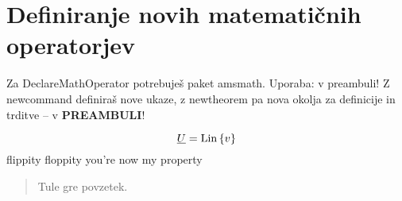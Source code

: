 \documentclass[a4paper]{article}
\DeclareMathOperator{\sgn}{sgn}
\DeclareMathOperator{\lin}{Lin}
\newcommand{\pip}{flippity floppity you're now my property}
\begin{document}

\nocite{*} %





\section{Definiranje novih matematičnih operatorjev}
Za DeclareMathOperator potrebuješ paket amsmath. Uporaba: v preambuli!
Z newcommand definiraš nove ukaze, z newtheorem pa nova okolja za 
definicije in trditve -- v \textbf{PREAMBULI}!

\[\emph{U} = \lin{\left\{ v \right\}}\]
\pip



\pagebreak
\begin{abstract}
    Tule gre povzetek.
\end{abstract}
\end{document}
